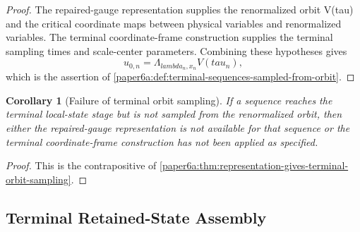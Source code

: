 \documentclass[11pt]{amsart}
\def\({}%
\def\){}%
\def\tau{tau}%
\def\lambda{lambda}%
\theoremstyle{plain}
\newtheorem{corollary}[corollary]{Corollary}
\theoremstyle{definition}
\theoremstyle{remark}
\begin{document}
\begin{proof}
The repaired-gauge representation supplies the renormalized orbit \(V(\tau)\)
and the critical coordinate maps between physical variables and renormalized
variables.  The terminal coordinate-frame construction supplies the terminal
sampling times and scale-center parameters.  Combining these hypotheses gives
\[
  u_{0,n}=\Lambda_{\lambda_n,x_n}V(\tau_n),
\]
which is the assertion of
\cref{paper6a:def:terminal-sequences-sampled-from-orbit}.
\end{proof}

\begin{corollary}[Failure of terminal orbit sampling]
\label{paper6a:cor:failure-terminal-orbit-sampling}
If a sequence reaches the terminal local-state stage but is not sampled from the
renormalized orbit, then either the repaired-gauge representation is not
available for that sequence or the terminal coordinate-frame construction has
not been applied as specified.
\end{corollary}

\begin{proof}
This is the contrapositive of
\cref{paper6a:thm:representation-gives-terminal-orbit-sampling}.
\end{proof}

\subsection{Terminal Retained-State Assembly}
\end{document}
